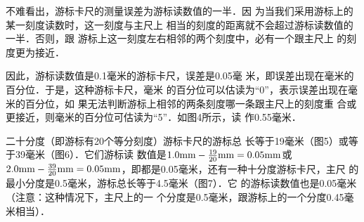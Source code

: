 不难看出，游标卡尺的测量误差为游标读数值的一半．因
为当我们采用游标上的某一刻度读数时，这一刻度与主尺上
相当的刻度的距离就不会超过游标读数值的一半．否则，跟
游标上这一刻度左右相邻的两个刻度中，必有一个跟主尺上
的刻度更为接近．

因此，游标读数值是0.1毫米的游标卡尺，误差是0.05毫
米，即误差出现在毫米的百分位．于是，这种游标卡尺，毫米
的百分位可以估读为“0”，表示误差出现在毫米的百分位，如
果无法判断游标上相邻的两条刻度哪一条跟主尺上的刻度重
合或更接近，则毫米的百分位可估读为“5”．如图4所示，读
作0.55毫米．

\begin{figure}[htp]\centering
    \begin{minipage}[t]{0.48\textwidth}
    \centering
{}
    \caption{}
    \end{minipage}
    \begin{minipage}[t]{0.48\textwidth}
    \centering
    \caption{}
    \end{minipage}
    \end{figure}

二十分度（即游标有20个等分刻度）游标卡尺的游标总
长等于19毫米（图5）或等于39毫米（图6）．它们游标读
数值是$1.0{\rm mm}-\frac{19}{20}{\rm mm}=0.05{\rm mm}$或$2.0{\rm mm}-\frac{39}{20}{\rm mm}=
0.05{\rm mm}$，即都是0.05毫米，还有一种十分度游标卡尺，主尺
的最小分度是0.5毫米，游标总长等于4.5毫米（图7）．它
的游标读数值也是0.05毫米（注意：这种情况下，主尺上的一
个分度是0.5毫米，跟游标上的一个分度0.45毫米相当）．

